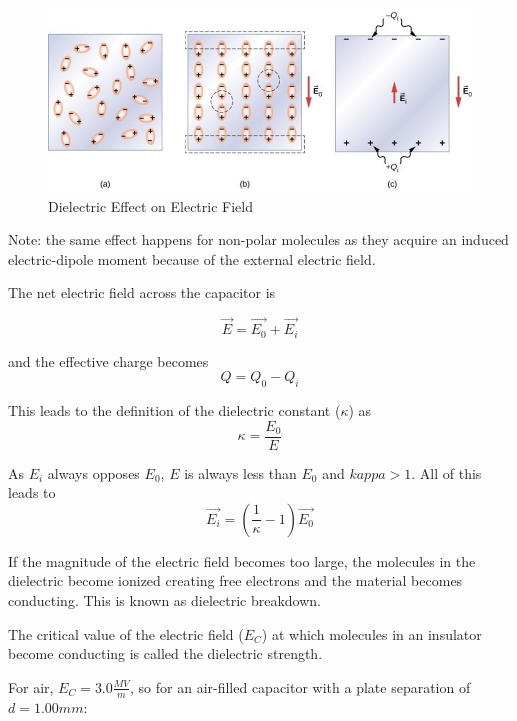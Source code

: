 \documentclass[14pt]{memoir}
\begin{document}
\begin{figure}[H]
\begin{center}
\includegraphics[scale=0.50]{fig/fig_08_20.jpg}
\caption{Dielectric Effect on Electric Field}
\label{fig:08_20}
\end{center}
\end{figure}

Note: the same effect happens for non-polar molecules as they acquire an induced electric-dipole moment because of the external electric field. 

The net electric field across the capacitor is 

\begin{equation}
\vec{E} = \vec{E_0} + \vec{E_i}
\end{equation}

and the effective charge becomes
\begin{equation}
Q = Q_0 - Q_i
\end{equation}

This leads to the definition of the dielectric constant ($\kappa$) as
\begin{equation}
\kappa = \frac{E_0}{E}
\end{equation}

As $E_i$ always opposes $E_0$, $E$ is always less than $E_0$ and $kappa > 1$. All of this leads to
\begin{equation}
\vec{E_i} = (\frac{1}{\kappa} - 1) \vec{E_0}
\end{equation}

If the magnitude of the electric field becomes too large, the molecules in the dielectric become ionized creating free electrons and the material becomes conducting. This is known as dielectric breakdown. 

The critical value of the electric field ($E_C$) at which molecules in an insulator become conducting is called the dielectric strength. 

For air, $E_C = 3.0 \frac{MV}{m}$, so for an air-filled capacitor with a plate separation of $d = 1.00mm$:
\end{document}
